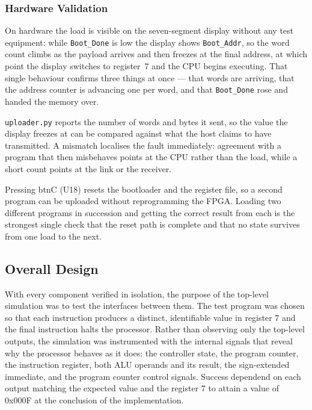 \documentclass[11pt,letterpaper]{article}
\begin{document}
\subsubsection{Hardware Validation}
On hardware the load is visible on the seven-segment display without any test
equipment: while \texttt{Boot\_Done} is low the display shows
\texttt{Boot\_Addr}, so the word count climbs as the payload arrives and then
freezes at the final address, at which point the display switches to register~7
and the CPU begins executing. That single behaviour confirms three things at
once --- that words are arriving, that the address counter is advancing one per
word, and that \texttt{Boot\_Done} rose and handed the memory over.

\texttt{uploader.py} reports the number of words and bytes it sent, so the
value the display freezes at can be compared against what the host claims to
have transmitted. A mismatch localises the fault immediately: agreement with a
program that then misbehaves points at the CPU rather than the load, while a
short count points at the link or the receiver.

Pressing btnC (U18) resets the bootloader and the register file, so a second
program can be uploaded without reprogramming the FPGA. Loading two different
programs in succession and getting the correct result from each is the
strongest single check that the reset path is complete and that no state
survives from one load to the next.

\subsection{Overall Design}
With every component verified in isolation, the purpose of the top-level simulation was to test the interfaces between them. The test program was chosen so that each instruction produces a distinct, identifiable value in register 7 and the final instruction halts the processor. Rather than observing only the top-level outputs, the simulation was instrumented with the internal signals that reveal why the processor behaves as it does: the controller state, the program counter, the instruction register, both ALU operands and its result, the sign-extended immediate, and the program counter control signals. Success dependend on each output matching the expected value and the register 7 to attain a value of 0x000F at the conclusion of the implementation. 
\end{document}
